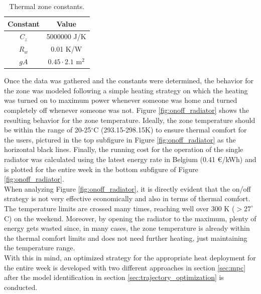 \begin{table}[H]
\centering
\begin{tabular}{c|c}
Constant & Value\\
\hline
\hline
$C_z$ & 5000000 J/K\\
$R_w$ & 0.01 K/W\\
$gA$ & $0.45\cdot2.1$ m$^2$ 
\end{tabular}
\caption{Thermal zone constants.}
\label{tab:constants}
\end{table}

Once the data was gathered and the constants were determined, the behavior for the zone was modeled following a simple heating strategy on which the heating was turned on to maximum power whenever someone was home and turned completely off whenever someone was not. Figure \ref{fig:onoff_radiator} shows the resulting behavior for the zone temperature. Ideally, the zone temperature should be within the range of 20-25$^\circ$C (293.15-298.15K) to ensure thermal comfort for the users, pictured in the top subfigure in Figure \ref{fig:onoff_radiator} as the horizontal black lines. Finally, the running cost for the operation of the single radiator was calculated using the latest energy rate in Belgium (0.41 €/kWh) and is plotted for the entire week in the bottom subfigure of Figure \ref{fig:onoff_radiator}.\\

When analyzing Figure \ref{fig:onoff_radiator}, it is directly evident that the on/off strategy is not very effective economically and also in terms of thermal comfort. The temperature limits are crossed many times, reaching well over 300 K ($>27^\circ$C) on the weekend. Moreover, by opening the radiator to the maximum, plenty of energy gets wasted since, in many cases, the zone temperature is already within the thermal comfort limits and does not need further heating, just maintaining the temperature range. \\

With this in mind, an optimized strategy for the appropriate heat deployment for the entire week is developed with two different approaches in section \ref{sec:mpc} after the model identification in section \ref{sec:trajectory_optimization} is conducted.


